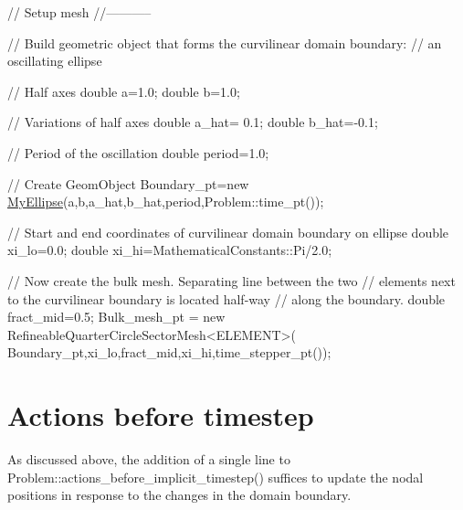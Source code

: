  
\begin{DoxyCodeInclude}
 \textcolor{comment}{// Setup mesh}
 \textcolor{comment}{//-----------}

 \textcolor{comment}{// Build geometric object that forms the curvilinear domain boundary:}
 \textcolor{comment}{// an oscillating ellipse}

 \textcolor{comment}{// Half axes}
 \textcolor{keywordtype}{double} a=1.0;
 \textcolor{keywordtype}{double} b=1.0;

 \textcolor{comment}{// Variations of half axes}
 \textcolor{keywordtype}{double} a\_hat= 0.1;
 \textcolor{keywordtype}{double} b\_hat=-0.1;

 \textcolor{comment}{// Period of the oscillation}
 \textcolor{keywordtype}{double} period=1.0;

 \textcolor{comment}{// Create GeomObject}
 Boundary\_pt=\textcolor{keyword}{new} \hyperlink{classMyEllipse}{MyEllipse}(a,b,a\_hat,b\_hat,period,Problem::time\_pt()); 

 \textcolor{comment}{// Start and end coordinates of curvilinear domain boundary on ellipse}
 \textcolor{keywordtype}{double} xi\_lo=0.0;
 \textcolor{keywordtype}{double} xi\_hi=MathematicalConstants::Pi/2.0;

 \textcolor{comment}{// Now create the bulk mesh. Separating line between the two }
 \textcolor{comment}{// elements next to the curvilinear boundary is located half-way}
 \textcolor{comment}{// along the boundary.}
 \textcolor{keywordtype}{double} fract\_mid=0.5;
 Bulk\_mesh\_pt = \textcolor{keyword}{new} RefineableQuarterCircleSectorMesh<ELEMENT>(
  Boundary\_pt,xi\_lo,fract\_mid,xi\_hi,time\_stepper\_pt());

\end{DoxyCodeInclude}




 

\hypertarget{index_actions_before_implicit_timestep}{}\section{Actions before timestep}\label{index_actions_before_implicit_timestep}
As discussed above, the addition of a single line to {\ttfamily Problem\+::actions\+\_\+before\+\_\+implicit\+\_\+timestep()} suffices to update the nodal positions in response to the changes in the domain boundary.

